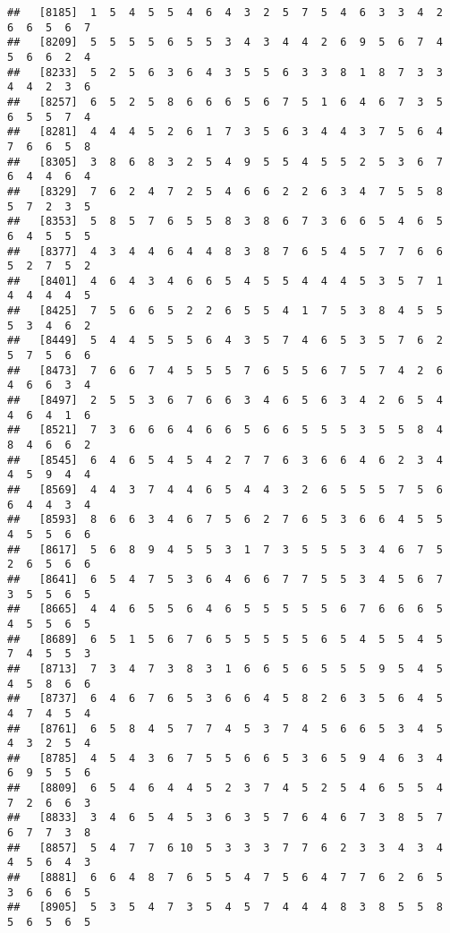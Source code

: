 \documentclass[
]{book}
\begin{document}
\begin{verbatim}
##   [8185]  1  5  4  5  5  4  6  4  3  2  5  7  5  4  6  3  3  4  2  6  6  5  6  7
##   [8209]  5  5  5  5  6  5  5  3  4  3  4  4  2  6  9  5  6  7  4  5  6  6  2  4
##   [8233]  5  2  5  6  3  6  4  3  5  5  6  3  3  8  1  8  7  3  3  4  4  2  3  6
##   [8257]  6  5  2  5  8  6  6  6  5  6  7  5  1  6  4  6  7  3  5  6  5  5  7  4
##   [8281]  4  4  4  5  2  6  1  7  3  5  6  3  4  4  3  7  5  6  4  7  6  6  5  8
##   [8305]  3  8  6  8  3  2  5  4  9  5  5  4  5  5  2  5  3  6  7  6  4  4  6  4
##   [8329]  7  6  2  4  7  2  5  4  6  6  2  2  6  3  4  7  5  5  8  5  7  2  3  5
##   [8353]  5  8  5  7  6  5  5  8  3  8  6  7  3  6  6  5  4  6  5  6  4  5  5  5
##   [8377]  4  3  4  4  6  4  4  8  3  8  7  6  5  4  5  7  7  6  6  5  2  7  5  2
##   [8401]  4  6  4  3  4  6  6  5  4  5  5  4  4  4  5  3  5  7  1  4  4  4  4  5
##   [8425]  7  5  6  6  5  2  2  6  5  5  4  1  7  5  3  8  4  5  5  5  3  4  6  2
##   [8449]  5  4  4  5  5  5  6  4  3  5  7  4  6  5  3  5  7  6  2  5  7  5  6  6
##   [8473]  7  6  6  7  4  5  5  5  7  6  5  5  6  7  5  7  4  2  6  4  6  6  3  4
##   [8497]  2  5  5  3  6  7  6  6  3  4  6  5  6  3  4  2  6  5  4  4  6  4  1  6
##   [8521]  7  3  6  6  6  4  6  6  5  6  6  5  5  5  3  5  5  8  4  8  4  6  6  2
##   [8545]  6  4  6  5  4  5  4  2  7  7  6  3  6  6  4  6  2  3  4  4  5  9  4  4
##   [8569]  4  4  3  7  4  4  6  5  4  4  3  2  6  5  5  5  7  5  6  6  4  4  3  4
##   [8593]  8  6  6  3  4  6  7  5  6  2  7  6  5  3  6  6  4  5  5  4  5  5  6  6
##   [8617]  5  6  8  9  4  5  5  3  1  7  3  5  5  5  3  4  6  7  5  2  6  5  6  6
##   [8641]  6  5  4  7  5  3  6  4  6  6  7  7  5  5  3  4  5  6  7  3  5  5  6  5
##   [8665]  4  4  6  5  5  6  4  6  5  5  5  5  5  6  7  6  6  6  5  4  5  5  6  5
##   [8689]  6  5  1  5  6  7  6  5  5  5  5  5  6  5  4  5  5  4  5  7  4  5  5  3
##   [8713]  7  3  4  7  3  8  3  1  6  6  5  6  5  5  5  9  5  4  5  4  5  8  6  6
##   [8737]  6  4  6  7  6  5  3  6  6  4  5  8  2  6  3  5  6  4  5  4  7  4  5  4
##   [8761]  6  5  8  4  5  7  7  4  5  3  7  4  5  6  6  5  3  4  5  4  3  2  5  4
##   [8785]  4  5  4  3  6  7  5  5  6  6  5  3  6  5  9  4  6  3  4  6  9  5  5  6
##   [8809]  6  5  4  6  4  4  5  2  3  7  4  5  2  5  4  6  5  5  4  7  2  6  6  3
##   [8833]  3  4  6  5  4  5  3  6  3  5  7  6  4  6  7  3  8  5  7  6  7  7  3  8
##   [8857]  5  4  7  7  6 10  5  3  3  3  7  7  6  2  3  3  4  3  4  4  5  6  4  3
##   [8881]  6  6  4  8  7  6  5  5  4  7  5  6  4  7  7  6  2  6  5  3  6  6  6  5
##   [8905]  5  3  5  4  7  3  5  4  5  7  4  4  4  8  3  8  5  5  8  5  6  5  6  5

\end{verbatim}
\end{document}
